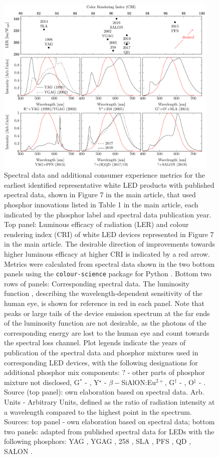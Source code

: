 \documentclass[10pt]{article}
\begin{document}
\begin{figure}[H]
	\centering
    \includegraphics[width=0.95\textwidth]{2_SSL_EST/article/figures/phosphor_spectrum-comparison.pdf}
	\caption{Spectral data and additional consumer experience metrics for the earliest identified representative white LED products with published spectral data, shown in Figure 7 in the main article, that used phosphor innovations listed in Table 1 in the main article, each indicated by the phosphor label and spectral data publication year. Top panel: Luminous efficacy of radiation (LER) and colour rendering index (CRI) of white LED devices represented in Figure 7 in the main article. The desirable direction of improvements towards higher luminous efficacy at higher CRI is indicated by a red arrow. Metrics were calculated from spectral data shown in the two bottom panels using the \texttt{colour-science} package for Python \cite{colour-science_software}. Bottom two rows of panels: Corresponding spectral data. The luminosity function \cite{cie-term-lumeff}, describing the wavelength-dependent sensitivity of the human eye, is shown for reference in red in each panel. Note that peaks or large tails of the device emission spectrum at the far ends of the luminosity function are not desirable, as the photons of the corresponding energy are lost to the human eye and count towards the spectral loss channel. Plot legends indicate the years of publication of the spectral data and phosphor mixtures used in corresponding LED devices, with the following designations for additional phosphor mix components: ? -  other parts of phosphor mixture not disclosed, G$^*$ - , Y$^\star$ - $\beta-$SiAlON:Eu$^{2+}$, G$^\dagger$ - , O$^\ddagger$ - . Source (top panel): own elaboration based on spectral data. Arb. Units - Arbitrary Units, defined as the ratio of radiation intensity at a wavelength compared to the highest point in the spectrum. Sources: top panel - own elaboration based on spectral data; bottom two panels: adapted from published spectral data for LEDs with the following phosphors: YAG \cite{bando1998development}, YGAG \cite{Mueller2002}, 258 \cite{MuellerMach2005}, SLA \cite{Pust2014}, PFS \cite{trigain_spectrum}, QD \cite{lumileds2016qd}\cite{osram2019qd}, SALON \cite{Hoerder2019}.}

\end{figure}
\end{document}
